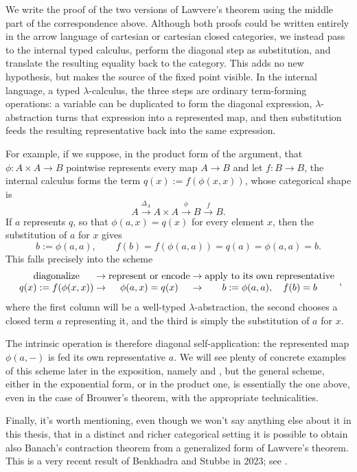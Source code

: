 We write the proof of the two versions of Lawvere's theorem using the middle part of the correspondence above.
Although both proofs could be written entirely in the arrow language of cartesian or cartesian closed categories, we instead pass to the internal typed calculus, perform the diagonal step as substitution, and translate the resulting equality back to the category.\newline
This adds no new hypothesis, but makes the source of the fixed point visible. In the internal language, a typed $\lambda$-calculus, the three steps are ordinary term-forming operations: a variable can be duplicated to form the diagonal expression, $\lambda$-abstraction turns that
expression into a represented map, and then substitution feeds the resulting representative back into the same expression.

For example, if we suppose, in the product form of the argument, that $\phi : A\times A \to B$ pointwise represents every map $A \to B$ and let
$f : B \to B$, the internal calculus forms the term $q(x) := f(\phi(x,x))$, whose
categorical shape is
    \[ A \xrightarrow{\Delta_A} A\times A \xrightarrow{\phi} B \xrightarrow{f} B.\]\label{idx:diagonal}
    If $a$ represents $q$, so that $\phi(a,x) = q(x)$ for every element $x$, then the substitution of $a$ for $x$ gives
\[b := \phi(a,a), \qquad f(b) = f(\phi(a,a)) = q(a) = \phi(a,a) = b. \]
This falls precisely into the scheme
\[\begin{array}{c@{\;\rightarrow\;}c@{\;\rightarrow\;}c} \text{diagonalize} & \text{represent or encode} & \text{apply to its own representative} \\
                                                         q(x):=f(\phi(x,x)) & \phi(a,x)=q(x) & b:=\phi(a,a),\quad f(b)=b
\end{array},\]
where the first column will be a well-typed $\lambda$-abstraction, the second chooses a closed term $a$ representing it, and the third is simply the substitution of $a$ for $x$.

The intrinsic operation is therefore diagonal self-application: the represented map $\phi(a,-)$ is fed its own representative $a$.
We will see plenty of concrete examples of this scheme later in the exposition, namely  and , but the general scheme, either in the exponential form, or in the product one,
is essentially the one above, even in the case of Brouwer's theorem, with the appropriate technicalities.

Finally, it's worth mentioning, even though we won't say anything else about it in this thesis, that in
a distinct and richer categorical setting it is possible to obtain also Banach's contraction theorem from a generalized form of Lawvere's theorem.
This is a very recent result of Benkhadra and Stubbe in 2023; see \parencite{BenkhadraStubbe2023}.
